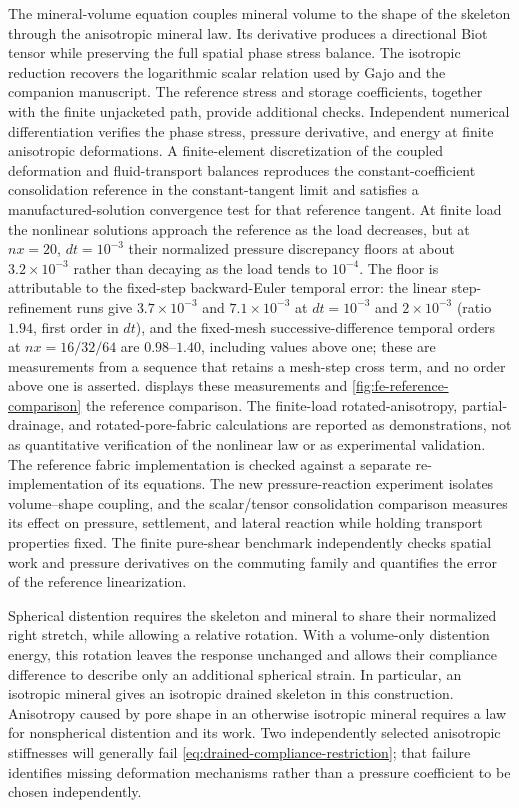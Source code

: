 \documentclass[11pt]{article}
\begin{document}
The mineral-volume equation couples mineral volume to the shape of the
skeleton through the anisotropic mineral law. Its derivative produces a
directional Biot tensor while preserving the full spatial phase stress
balance. The
isotropic reduction recovers the logarithmic scalar relation used by Gajo
and the companion manuscript. The reference stress and storage coefficients,
together with the finite unjacketed path, provide additional checks. Independent
numerical differentiation verifies the phase stress, pressure derivative,
and energy at finite anisotropic deformations. A finite-element
discretization of the coupled deformation and fluid-transport balances
reproduces the constant-coefficient consolidation reference in the
constant-tangent limit and satisfies a manufactured-solution convergence test
for that reference tangent. At finite load the nonlinear solutions approach
the reference as the load decreases, but at \(nx=20\), \(dt=10^{-3}\) their
normalized pressure discrepancy floors at about \(3.2\times10^{-3}\) rather
than decaying as the load tends to \(10^{-4}\). The floor is attributable to the fixed-step backward-Euler temporal error: the linear
step-refinement runs give \(3.7\times10^{-3}\) and \(7.1\times10^{-3}\) at
\(dt=10^{-3}\) and \(2\times10^{-3}\) (ratio \(1.94\), first order in \(dt\)),
and the fixed-mesh successive-difference temporal orders at \(nx=16/32/64\)
are \(0.98\)--\(1.40\), including values above one; these are measurements
from a sequence that retains a mesh-step cross term, and no order above one
is asserted.  displays these measurements and
\cref{fig:fe-reference-comparison} the reference comparison. The finite-load
rotated-anisotropy, partial-drainage, and rotated-pore-fabric calculations are
reported as demonstrations, not as quantitative verification of the nonlinear
law or as experimental validation. The reference fabric implementation is
checked against a separate re-implementation of its equations. The new
pressure-reaction experiment isolates volume--shape coupling, and the
scalar/tensor consolidation comparison measures its effect on pressure,
settlement, and lateral reaction while holding transport properties fixed.
The finite pure-shear benchmark independently checks spatial work and
pressure derivatives on the commuting family and quantifies the error of
the reference linearization.

Spherical distention requires the skeleton and mineral to share their
normalized right stretch, while allowing a relative rotation. With a
volume-only distention energy, this rotation leaves the response unchanged and
allows their compliance difference to describe only an additional spherical
strain. In particular, an isotropic mineral gives an isotropic drained
skeleton in this construction. Anisotropy caused by pore shape in an
otherwise isotropic mineral requires a law for nonspherical distention and
its work. Two independently selected anisotropic stiffnesses will generally
fail \eqref{eq:drained-compliance-restriction}; that failure identifies
missing deformation mechanisms rather than a pressure coefficient to be
chosen independently.
\end{document}
